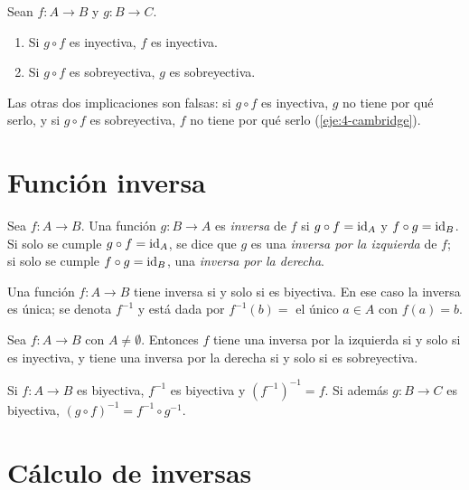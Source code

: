 \begin{proposicion}\label{prop:t4-reciproco}
Sean $f\colon A\to B$ y $g\colon B\to C$.
\begin{enumerate}
  \item Si $g\circ f$ es inyectiva, $f$ es inyectiva.
  \item Si $g\circ f$ es sobreyectiva, $g$ es sobreyectiva.
\end{enumerate}
\end{proposicion}

Las otras dos implicaciones son falsas: si $g\circ f$ es inyectiva, $g$ no tiene por qué serlo, y si $g\circ f$ es sobreyectiva, $f$ no tiene por qué serlo (\cref{eje:4-cambridge}).

\section{Función inversa}

\begin{definicion}[Inversa]
Sea $f\colon A\to B$. Una función $g\colon B\to A$ es \emph{inversa} de $f$ si $g\circ f=\mathrm{id}_A$ y $f\circ g=\mathrm{id}_B$. Si solo se cumple $g\circ f=\mathrm{id}_A$, se dice que $g$ es una \emph{inversa por la izquierda} de $f$; si solo se cumple $f\circ g=\mathrm{id}_B$, una \emph{inversa por la derecha}.
\end{definicion}

\begin{teorema}\label{teo:t4-inversa}
Una función $f\colon A\to B$ tiene inversa si y solo si es biyectiva. En ese caso la inversa es única; se denota $f^{-1}$ y está dada por $f^{-1}(b)=$ el único $a\in A$ con $f(a)=b$.
\end{teorema}

\begin{proposicion}\label{prop:t4-laterales}
Sea $f\colon A\to B$ con $A\neq\emptyset$. Entonces $f$ tiene una inversa por la izquierda si y solo si es inyectiva, y tiene una inversa por la derecha si y solo si es sobreyectiva.
\end{proposicion}

\begin{proposicion}\label{prop:t4-inv-comp}
Si $f\colon A\to B$ es biyectiva, $f^{-1}$ es biyectiva y $(f^{-1})^{-1}=f$. Si además $g\colon B\to C$ es biyectiva, $(g\circ f)^{-1}=f^{-1}\circ g^{-1}$.
\end{proposicion}

\section{Cálculo de inversas}

